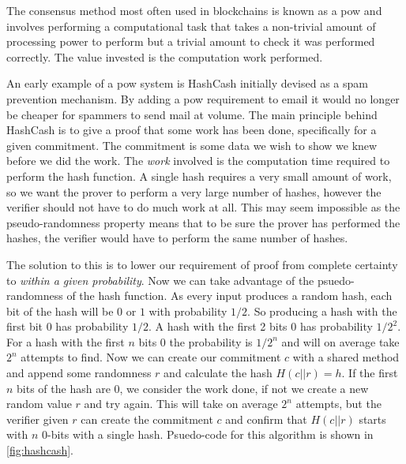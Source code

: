 The consensus method most often used in blockchains is known as a \gls{pow} and involves performing a computational task that takes a non-trivial amount of processing power to perform but a trivial amount to check it was performed correctly. The value invested is the computation work performed.

An early example of a \gls{pow} system is HashCash \cite{back_hashcash_2002} initially devised as a spam prevention mechanism. By adding a \gls{pow} requirement to email it would no longer be cheaper for spammers to send mail at volume. The main principle behind HashCash is to give a proof that some work has been done, specifically for a given commitment. The commitment is some data we wish to show we knew before we did the work. The \emph{work} involved is the computation time required to perform the hash function. A single hash requires a very small amount of work, so we want the prover to perform a very large number of hashes, however the verifier should not have to do much work at all. This may seem impossible as the pseudo-randomness property means that to be sure the prover has performed the hashes, the verifier would have to perform the same number of hashes.

The solution to this is to lower our requirement of proof from complete certainty to \emph{within a given probability}. Now we can take advantage of the psuedo-randomness of the hash function. As every input produces a random hash, each bit of the hash will be $0$ or $1$ with probability $1/2$. So producing a hash with the first bit $0$ has probability $1/2$. A hash with the first 2 bits $0$ has probability $1/2^2$. For a hash with the first $n$ bits $0$ the probability is $1/2^n$ and will on average take $2^n$ attempts to find. Now we can create our commitment $c$ with a shared method and append some randomness $r$ and calculate the hash $H(c || r) = h$. If the first $n$ bits of the hash are 0, we consider the work done, if not we create a new random value $r$ and try again. This will take on average $2^n$ attempts, but the verifier given $r$ can create the commitment $c$ and confirm that $H(c || r)$ starts with $n$ 0-bits with a single hash. Psuedo-code for this algorithm is shown in \autoref{fig:hashcash}.


